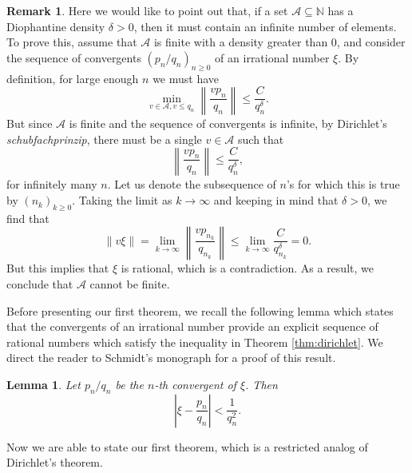 \documentclass[reqno]{amsart}
\newtheorem{lemma}{Lemma}
\theoremstyle{definition}
\newtheorem{remark}{Remark}
\newcommand{\dnint}[1]{\left\|{#1}\right\|}
\begin{document}
\begin{remark}
    Here we would like to point out that, if a set $\mathcal{A} \subseteq \mathbb{N}$ has a Diophantine density $\delta > 0$, then it must contain an infinite number of elements. To prove this, assume that $\mathcal{A}$ is finite with a density greater than $0$, and consider the sequence of convergents $(p_{n}/q_{n})_{n\geq 0}$ of an irrational number $\xi$.  By definition, for large enough $n$ we must have
    \begin{equation*}
    \min_{v\in\mathcal{A},v\leq q_{n}}\dnint{\frac{v p_{n}}{q_{n}}} \leq \frac{C}{q_{n}^{\delta}}.
\end{equation*}
But since $\mathcal{A}$ is finite and the sequence of convergents is infinite, by Dirichlet's \textit{schubfachprinzip}, there must be a single $v \in \mathcal{A}$ such that 
    \begin{equation*}
    \dnint{\frac{v p_{n}}{q_{n}}} \leq \frac{C}{q_{n}^{\delta}},
\end{equation*}
for infinitely many $n$.  Let us denote the subsequence of $n$'s for which this is true by $(n_{k})_{k\geq 0}$. Taking the limit as $k\to\infty$ and keeping in mind that $\delta > 0$, we find that
\begin{equation*}
    \dnint{v \xi} = \lim_{k\to\infty}\dnint{\frac{v p_{n_{k}}}{q_{n_{k}}}} \leq \lim_{k\to\infty}\frac{C}{q_{n_{k}}^{\delta}} = 0.
\end{equation*}
But this implies that $\xi$ is rational, which is a contradiction.  As a result, we conclude that $\mathcal{A}$ cannot be finite.
\end{remark}

Before presenting our first theorem, we recall the following lemma which states that the convergents of an irrational number provide an explicit sequence of rational numbers which satisfy the inequality in Theorem \ref{thm:dirichlet}.  We direct the reader to Schmidt's monograph \cite{schmidt1980} for a proof of this result.

\begin{lemma}\label{lem:cnvgt_diff}
    Let $p_{n}/q_{n}$ be the $n$-th convergent of $\xi$.  Then
    \begin{equation*}
        \left\vert{\xi - \frac{p_{n}}{q_{n}}}\right\vert < \frac{1}{q^2_{n}}.
    \end{equation*}
\end{lemma}

Now we are able to state our first theorem, which is a restricted analog of Dirichlet's theorem.
\end{document}
